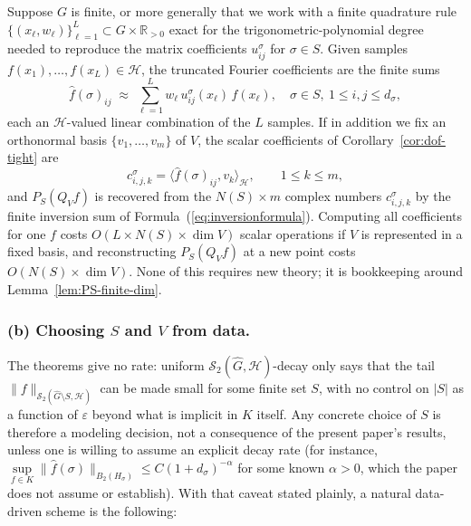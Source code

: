 \documentclass[11pt]{amsart}
\begin{document}
Suppose $G$ is finite, or more generally that we work with a finite
quadrature rule $\{(x_\ell,w_\ell)\}_{\ell=1}^L\subset G\times\mathbb R_{>0}$
exact for the trigonometric-polynomial degree needed to reproduce the
matrix coefficients $u^\sigma_{ij}$ for $\sigma\in S$.
Given samples $f(x_1),\dots,f(x_L)\in \mathcal{H}$, the truncated Fourier
coefficients are the finite sums
\begin{equation}
\widehat f(\sigma)_{ij} \;\approx\; \sum_{\ell=1}^{L} w_\ell\, u^\sigma_{ij}(x_\ell)\, f(x_\ell),
\quad \sigma\in S,\ 1\le i,j\le d_\sigma,
\end{equation}
each an $\mathcal{H}$-valued linear combination of the $L$ samples. If in addition we
fix an orthonormal basis $\{v_1,\dots,v_m\}$ of $V$, the scalar coefficients
of Corollary~\ref{cor:dof-tight} are
\[
c^\sigma_{i,j,k} = \big\langle \hat f(\sigma)_{ij}, v_k \big\rangle_\mathcal{H},
\qquad 1\le k\le m,
\]
and $P_S(Q_Vf)$ is recovered from the $N(S)\times m$ complex numbers $c^\sigma_{i,j,k} $
by the finite inversion sum of Formula~(\ref{eq:inversionformula}). Computing all coefficients for one $f$ costs
$O(L\times N(S)\times \dim V)$ scalar operations if $V$ is represented in a
fixed basis, and reconstructing $P_S(Q_Vf)$ at a new point costs
$O(N(S)\times \dim V)$. None of this requires new theory; it is bookkeeping
around Lemma~\ref{lem:PS-finite-dim}.

\subsubsection*{(b) Choosing $S$ and $V$ from data.}

The theorems give no rate: uniform $\mathscr{S}_2(\widehat{G},\mathcal{H})$-decay only says that the tail
$\|f\|_{\mathscr{S}_2(\widehat{G}\setminus S,\mathcal{H})}$ can be made small for some finite set $S$, with no control on $|S|$ as a function of $\varepsilon$ beyond what is
implicit in $K$ itself. Any concrete choice of $S$ is therefore a modeling
decision, not a consequence of the present paper's results, unless one is willing
to assume an explicit decay rate (for instance,  $\sup\limits_{f\in K}\|\widehat{f} (\sigma)\|_{B_2(H_\sigma)}
\le C(1+d_\sigma)^{-\alpha}$ for some known $\alpha>0$, which the paper
does not assume or establish). With that caveat stated plainly, a natural
data-driven scheme is the following:
\end{document}
